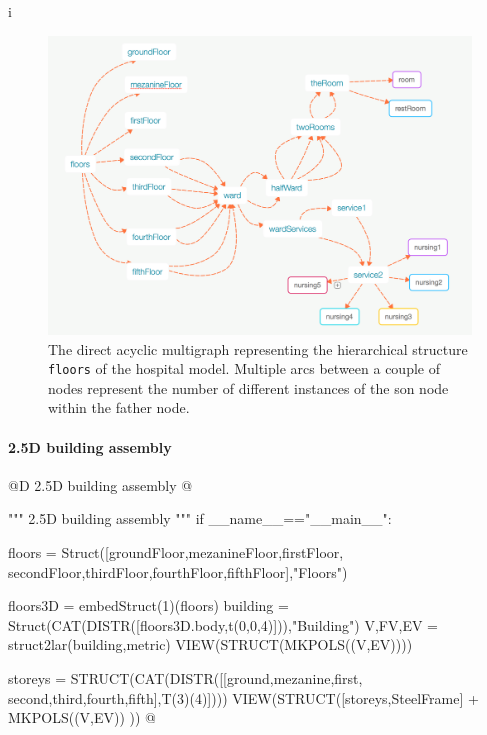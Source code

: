 i\documentclass[11pt,oneside]{article}    %
\begin{document}
\begin{figure}[htbp] %
   \centering
   \includegraphics[width=\linewidth]{images/multigraph} 
   \caption{The direct acyclic multigraph representing the hierarchical structure \texttt{floors} of the hospital model. 
   Multiple arcs between a couple of nodes represent the number of different instances of the son node within the father node.}
   \label{fig:multigraph}
\end{figure}

\paragraph{2.5D building assembly}
@D 2.5D building assembly
@{""" 2.5D building assembly """       
if __name__=="__main__":
 
    floors = Struct([groundFloor,mezanineFloor,firstFloor,
                     secondFloor,thirdFloor,fourthFloor,fifthFloor],"Floors")
    
    floors3D = embedStruct(1)(floors)
    building = Struct(CAT(DISTR([floors3D.body,t(0,0,4)])),"Building")
    V,FV,EV = struct2lar(building,metric)
    VIEW(STRUCT(MKPOLS((V,EV))))
    
    storeys = STRUCT(CAT(DISTR([[ground,mezanine,first,
                    second,third,fourth,fifth],T(3)(4)])))
    VIEW(STRUCT([storeys,SteelFrame] + MKPOLS((V,EV)) ))
@}
\end{document}

